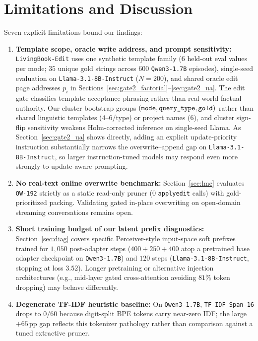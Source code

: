 \documentclass[11pt]{article}
\newcommand{\pp}{\,\text{pp}}
\renewcommand{\_}{\origunderscore\allowbreak}
\begin{document}
\section{Limitations and Discussion}
\label{sec:limitations}

Seven explicit limitations bound our findings:
\begin{enumerate}
    \item \textbf{Template scope, oracle write address, and prompt sensitivity:} \texttt{LivingBook-Edit} uses one synthetic template family ($6$ held-out eval values per mode; $35$ unique gold strings across $600$ \texttt{Qwen3-1.7B} episodes), single-seed evaluation on \texttt{Llama-3.1-8B-Instruct} ($N=200$), and shared oracle edit page addresses $p_i$ in Sections~\ref{sec:gate2_factorial}--\ref{sec:gate2_ua}. The edit gate classifies template acceptance phrasing rather than real-world factual authority. Our cluster bootstrap groups $( \texttt{mode}, \texttt{query\_type}, \texttt{gold} )$ rather than shared linguistic templates ($4$--$6$/type) or project names ($6$), and cluster sign-flip sensitivity weakens Holm-corrected inference on single-seed Llama. As Section~\ref{sec:gate2_ua} shows directly, adding an explicit update-priority instruction substantially narrows the overwrite--append gap on \texttt{Llama-3.1-8B-Instruct}, so larger instruction-tuned models may respond even more strongly to update-aware prompting.
    \item \textbf{No real-text online overwrite benchmark:} Section~\ref{sec:lme} evaluates \texttt{OW-192} strictly as a static read-only pruner ($0$ \texttt{apply\_edit} calls) with gold-prioritized packing. Validating gated in-place overwriting on open-domain streaming conversations remains open.
    \item \textbf{Short training budget of our latent prefix diagnostics:} Section~\ref{sec:diag} covers specific Perceiver-style input-space soft prefixes trained for $1{,}050$ post-adapter steps ($400+250+400$ atop a pretrained base adapter checkpoint on \texttt{Qwen3-1.7B}) and $120$ steps (\texttt{Llama-3.1-8B-Instruct}, stopping at loss $3.52$). Longer pretraining or alternative injection architectures (e.g., mid-layer gated cross-attention avoiding $81\%$ token dropping) may behave differently.
    \item \textbf{Degenerate TF-IDF heuristic baseline:} On \texttt{Qwen3-1.7B}, \texttt{TF-IDF Span-16} drops to $0/60$ because digit-split BPE tokens carry near-zero IDF; the large $+65\pp$ gap reflects this tokenizer pathology rather than comparison against a tuned extractive pruner.

\end{enumerate}
\end{document}
